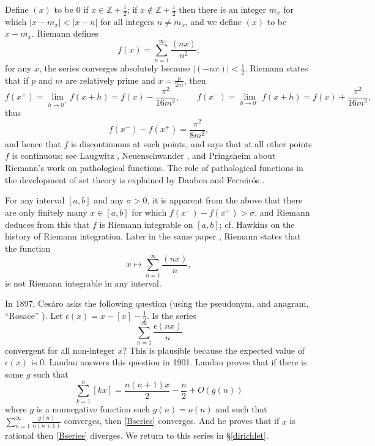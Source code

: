 \documentclass{article}
\begin{document}
Define $(x)$ to be $0$ if $x  \in \mathbb{Z}+\frac{1}{2}$; if $x \not \in \mathbb{Z}+\frac{1}{2}$ then there is
an integer $m_x$ for which $|x-m_x| < |x-n|$ for all integers $n \neq m_x$, and we define $(x)$ to be $x-m_x$. 
Riemann \cite[p.~105, \S 6]{riemann} defines 
\[
f(x)=\sum_{n=1}^\infty \frac{(nx)}{n^2};
\]
for any $x$, the series converges absolutely because $|(-nx)|<\frac{1}{2}$. 
Riemann states that if  $p$ and $m$ are relatively prime and $x=\frac{p}{2m}$,  then
\[
f(x^+)=\lim_{h \to 0^+} f(x+h) = f(x)-\frac{\pi^2}{16m^2}, \qquad f(x^-)=\lim_{h \to 0^-} f(x+h) = f(x)+\frac{\pi^2}{16m^2},
\]
thus
\[
f(x^-)-f(x^+)=\frac{\pi^2}{8m^2},
\]
and hence that $f$ is discontinuous at such points, and says that at all other points $f$ is continuous; see Laugwitz \cite[\S 2.1.1, pp. 183-184]{laugwitz},
Neuenschwander \cite{neuenschwander}, and Pringsheim \cite[p.~37]{pringsheim} about Riemann's work on pathological functions.
The role of pathological functions in the development of set theory is explained by Dauben \cite[Chapter 1, p. 19]{dauben} and Ferreirós \cite[Chapter V, \S 1, p. 152]{Labyrinth}.

For any interval $[a,b]$ and any $\sigma>0$, it is apparent from the above that there are only finitely many $x \in [a,b]$ for which
$f(x^-)-f(x^+)>\sigma$, and Riemann deduces from this that $f$ is  Riemann integrable on $[a,b]$; cf. Hawkins  \cite[p.~18]{hawkins} on the history
of Riemann integration.
Later in the same paper  \cite[p.~129, \S 13]{riemann}, Riemann states that the function
\[
x \mapsto \sum_{n=1}^\infty \frac{(nx)}{n},
\] 
is not Riemann integrable in any interval.


In 1897, Ces\`aro \cite{rosace} asks the following question (using the pseudonym, and anagram, ``Rosace'' \cite[p.~331]{perna}).
Let $\epsilon(x)=x-[x]-\frac{1}{2}$. Is the series
\begin{equation}
\sum_{n=1}^\infty \frac{\epsilon(nx)}{n}
\label{Bseries}
\end{equation}
convergent for all non-integer $x$? This is plausible because the expected value of $\epsilon(x)$ is 0. Landau \cite{landau} answers this question in 1901. Landau proves that if there is some $g$ such that 
\[
\sum_{k=1}^n [kx]=\frac{n(n+1)x}{2}-\frac{n}{2}+O(g(n))
\]
where $g$ is a nonnegative function such $g(n)=o(n)$ and such that $\sum_{n=1}^\infty \frac{g(n)}{n(n+1)}$ converges, then \eqref{Bseries} converges. And he proves that if $x$ is rational then \eqref{Bseries} diverges.
We
return to this series in \S \ref{dirichlet}.
\end{document}
